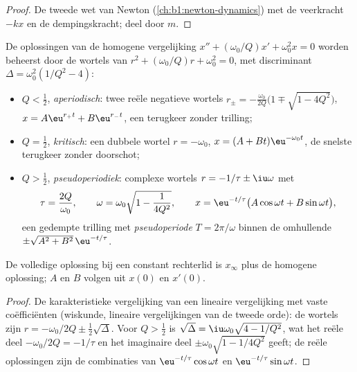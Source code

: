 \begin{proof}
De tweede wet van Newton (\cref{ch:b1:newton-dynamics}) met de veerkracht
$-kx$ en de dempingskracht; deel door $m$.
\end{proof}

\begin{theorem}\label{thm:b1:transient-regimes:regimes}
De oplossingen van de homogene vergelijking $x'' + (\omega_0/Q)x' +
\omega_0^2 x = 0$ worden beheerst door de wortels van $r^2 + (\omega_0/Q)r +
\omega_0^2 = 0$, met discriminant $\Delta = \omega_0^2(1/Q^2 - 4)$:
\begin{itemize}
  \item $Q < \tfrac12$, \emph{aperiodisch}: twee reële negatieve wortels
        $r_\pm = -\frac{\omega_0}{2Q}\big(1 \mp \sqrt{1 - 4Q^2}\big)$,
        $x = A\eu^{r_+t} + B\eu^{r_-t}$, een terugkeer zonder trilling;
  \item $Q = \tfrac12$, \emph{kritisch}: een dubbele wortel $r = -\omega_0$,
        $x = (A + Bt)\eu^{-\omega_0 t}$, de snelste terugkeer zonder
        doorschot;
  \item $Q > \tfrac12$, \emph{pseudoperiodiek}: complexe wortels
        $r = -1/\tau \pm \iu\omega$ met
        \[
        \tau = \frac{2Q}{\omega_0}, \qquad
        \omega = \omega_0\sqrt{1 - \frac{1}{4Q^2}},
        \qquad
        x = \eu^{-t/\tau}\big(A\cos\omega t + B\sin\omega t\big),
        \]
        een gedempte trilling met \emph{pseudoperiode} $T = 2\pi/\omega$
        binnen de omhullende $\pm\sqrt{A^2 + B^2}\,\eu^{-t/\tau}$.
\end{itemize}
De volledige oplossing bij een constant rechterlid is $x_\infty$ plus de
homogene oplossing; $A$ en $B$ volgen uit $x(0)$ en $x'(0)$.
\end{theorem}

\begin{proof}
De karakteristieke vergelijking van een lineaire vergelijking met vaste
coëfficiënten (wiskunde, lineaire vergelijkingen van de tweede orde): de
wortels zijn $r = -\omega_0/2Q \pm \tfrac12\sqrt\Delta$. Voor $Q > \tfrac12$ is
$\sqrt\Delta = \iu\omega_0\sqrt{4 - 1/Q^2}$, wat het reële deel
$-\omega_0/2Q = -1/\tau$ en het imaginaire deel $\pm\omega_0\sqrt{1 - 1/4Q^2}$ geeft;
de reële oplossingen zijn de combinaties van $\eu^{-t/\tau}\cos\omega t$
en $\eu^{-t/\tau}\sin\omega t$.
\end{proof}

